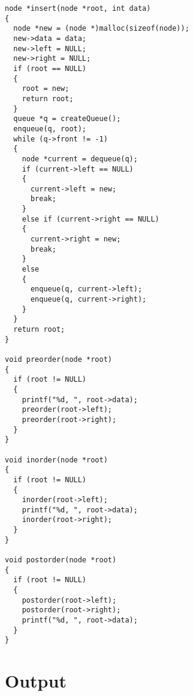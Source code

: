 \begin{lstlisting}[label={list:c_progam1}]
node *insert(node *root, int data)
{
  node *new = (node *)malloc(sizeof(node));
  new->data = data;
  new->left = NULL;
  new->right = NULL;
  if (root == NULL)
  {
    root = new;
    return root;
  }
  queue *q = createQueue();
  enqueue(q, root);
  while (q->front != -1)
  {
    node *current = dequeue(q);
    if (current->left == NULL)
    {
      current->left = new;
      break;
    }
    else if (current->right == NULL)
    {
      current->right = new;
      break;
    }
    else
    {
      enqueue(q, current->left);
      enqueue(q, current->right);
    }
  }
  return root;
}

void preorder(node *root)
{
  if (root != NULL)
  {
    printf("%d, ", root->data);
    preorder(root->left);
    preorder(root->right);
  }
}

void inorder(node *root)
{
  if (root != NULL)
  {
    inorder(root->left);
    printf("%d, ", root->data);
    inorder(root->right);
  }
}

void postorder(node *root)
{
  if (root != NULL)
  {
    postorder(root->left);
    postorder(root->right);
    printf("%d, ", root->data);
  }
}
\end{lstlisting}


\section{Output}

